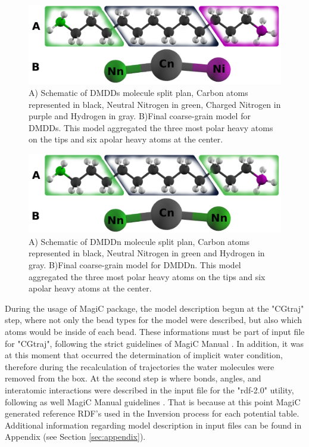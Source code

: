 \documentclass[10pt,a4paper,twoside]{article}
\begin{document}
\begin{figure}[ht!]
  \begin{center}
	\includegraphics[width=1\textwidth]{./images/dmddscg.png}
	\caption{A) Schematic of DMDDs molecule split plan, Carbon atoms represented in black, Neutral Nitrogen in green, Charged Nitrogen in purple and Hydrogen in gray. B)Final coarse-grain model for DMDDs. This model aggregated the three most polar heavy atoms on the tips and six apolar heavy atoms at the center.}
	\label{Fig:M3-1}
  \end{center}
\end{figure}
\begin{figure}[ht!]
  \begin{center}
	\includegraphics[width=1\textwidth]{./images/dmddncg.png}
	\caption{A) Schematic of DMDDn molecule split plan, Carbon atoms represented in black, Neutral Nitrogen in green and Hydrogen in gray. B)Final coarse-grain model for DMDDn. This model aggregated the three most polar heavy atoms on the tips and six apolar heavy atoms at the center.}
	\label{Fig:M3-2}
  \end{center}
\end{figure}


During the usage of MagiC package, the model description begun at the "CGtraj" step, where  not only the bead types for the model were described, but also which atoms would be inside of each bead. These informations must be part of input file for "CGtraj", following the strict guidelines of MagiC Manual \cite{magicmanu}. In addition, it was at this moment that occurred the determination of implicit water condition, therefore during the recalculation of trajectories the water molecules were removed from the box. At the second step is where bonds, angles, and interatomic interactions were described in the input file for the "rdf-2.0" utility, following as well MagiC Manual guidelines \cite{magicmanu}.  That is because at this point MagiC generated reference RDF's used in the Inversion process for each potential table. Additional information regarding model description in input files can be found in Appendix (see Section \ref{sec:appendix}).
\end{document}
